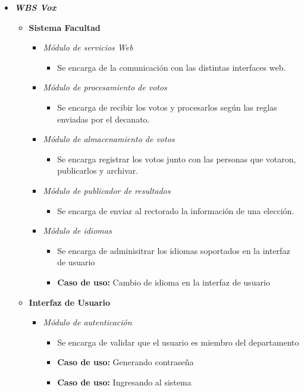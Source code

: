 \begin{itemize}
 \item {\bf \emph{WBS Vox}}
\begin{itemize}
 \item {\bf Sistema Facultad}
\begin{itemize}
 \item \emph{M\'odulo de servicios Web} 
\begin{itemize}
 \item Se encarga de la comunicación con las distintas interfaces web.
\end{itemize}
 \item \emph{M\'odulo de procesamiento de votos} 
\begin{itemize}
 \item Se encarga de recibir los votos y procesarlos según las reglas enviadas por el decanato.
\end{itemize}
 \item \emph{M\'odulo de almacenamiento de votos} 
\begin{itemize}
 \item Se encarga registrar los votos junto con las personas que votaron, publicarlos y archivar.
\end{itemize}
 \item \emph{M\'odulo de publicador de resultados} 
\begin{itemize}
 \item Se encarga de enviar al rectorado la información de una elección.
\end{itemize}
 \item \emph{M\'odulo de idiomas}
\begin{itemize}
 \item Se encarga de adminisitrar los idiomas soportados en la interfaz de usuario
 \item {\bf Caso de uso:} Cambio de idioma en la interfaz de usuario
\end{itemize}
\end{itemize}
 \item {\bf Interfaz de Usuario}
\begin{itemize}
 \item \emph{M\'odulo de autenticación}
\begin{itemize}
 \item Se encarga de validar que el usuario es miembro del departamento
 \item {\bf Caso de uso:} Generando contrase\~na
 \item {\bf Caso de uso:} Ingresando al sistema

\end{itemize}
\end{itemize}
\end{itemize}
\end{itemize}
